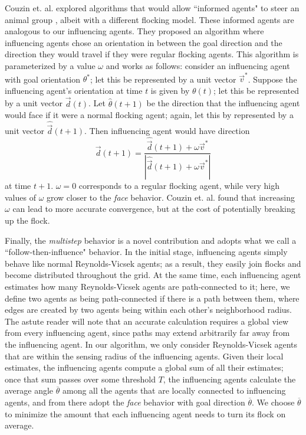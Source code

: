 Couzin et. al. explored algorithms that would allow ``informed agents" to steer
an animal group \cite{couzin2005}, albeit with a different flocking model.
These informed agents are analogous to our influencing agents.
They proposed an algorithm where influencing agents chose an orientation in
between the goal direction and the direction they would travel if they were
regular flocking agents.
This algorithm is parameterized by a value $\omega$ and works as follows:
consider an influencing agent with goal orientation $\theta^*$; let this be
represented by a unit vector $\vec{v}^*$.
Suppose the influencing agent's orientation at time $t$ is given by
$\theta(t)$; let this be represented by a unit vector $\vec{d}(t)$.
Let $\hat{\theta}(t+1)$ be the direction that the influencing agent would face
if it were a normal flocking agent; again, let this by represented by a unit
vector $\hat{\vec{d}}(t+1)$.
Then influencing agent would have direction
$$\vec{d}(t+1) = \frac{\hat{\vec{d}}(t+1) + \omega\vec{v}^*}
{|\hat{\vec{d}}(t+1) + \omega\vec{v}^*|}$$
at time $t+1$.
$\omega=0$ corresponds to a regular flocking agent, while very high
values of $\omega$ grow closer to the \textit{face} behavior.
Couzin et. al. found that increasing $\omega$ can lead to more accurate
convergence, but at the cost of potentially breaking up the flock.

Finally, the \textit{multistep} behavior is a novel contribution and adopts
what we call a ``follow-then-influence" behavior.
In the initial stage, influencing agents simply behave like normal Reynolds-Vicsek 
agents; as a result, they easily join flocks and become distributed throughout
the grid.
At the same time, each influencing agent estimates how many Reynolds-Vicsek agents
are path-connected to it; here, we define two agents as being path-connected if
there is a path between them, where edges are created by two agents being
within each other's neighborhood radius.
The astute reader will note that an accurate calculation requires a global view
from every influencing agent, since paths may extend arbitrarily far away from
the influencing agent.
In our algorithm, we only consider Reynolds-Vicsek agents that are within the
sensing radius of the influencing agents.
Given their local estimates, the influencing agents compute a global sum of all
their estimates; once that sum passes over some threshold $T$, the influencing
agents calculate the average angle $\overline{\theta}$ among all the agents that
are locally connected to influencing agents, and from there adopt the
\textit{face} behavior with goal direction $\overline{\theta}$.
We choose $\overline{\theta}$ to minimize the amount that each influencing 
agent needs to turn its flock on average.

